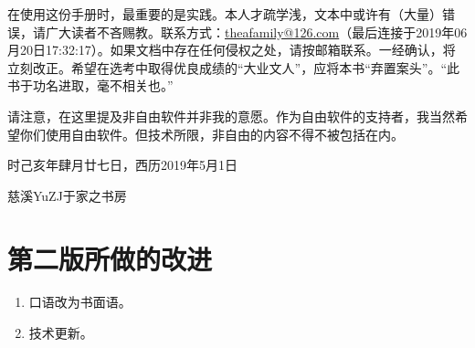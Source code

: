 在使用这份手册时，最重要的是实践。本人才疏学浅，文本中或许有（大量）错误，请广大读者不吝赐教。联系方式：\url{theafamily@126.com}（最后连接于2019年06月20日17:32:17）。如果文档中存在任何侵权之处，请按邮箱联系。一经确认，将立刻改正。希望在选考中取得优良成绩的“大业文人”，应将本书“弃置案头”。“此书于功名进取，毫不相关也。”\par
请注意，在这里提及非自由软件并非我的意愿。作为自由软件的支持者，我当然希望你们使用自由软件。但技术所限，非自由的内容不得不被包括在内。\par
时己亥年肆月廿七日，西历2019年5月1日\par
慈溪YuZJ于家之书房
\section{第二版所做的改进}
\begin{enumerate}
\item 口语改为书面语。
\item 技术更新。
\end{enumerate}
